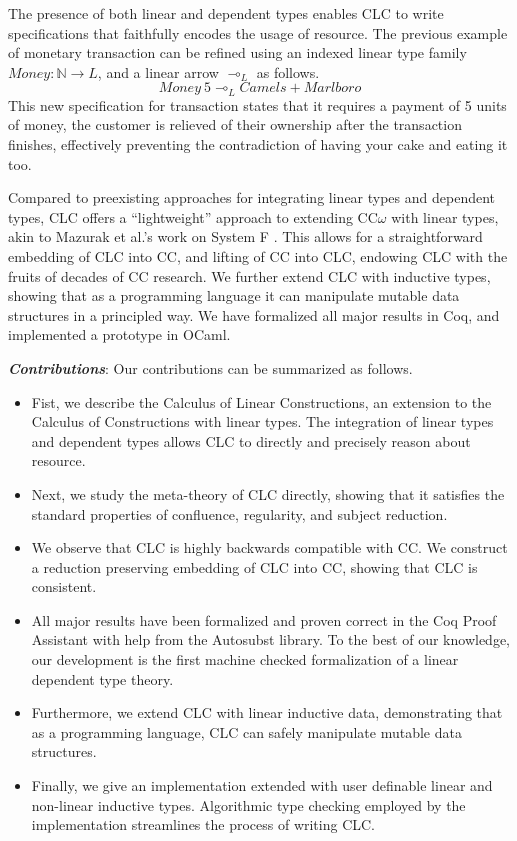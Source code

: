 \documentclass{article}
\theoremstyle{definition}
\begin{document}
  The presence of both linear and dependent types enables CLC to write specifications that faithfully encodes the usage of resource. The previous example of monetary transaction can be refined using an indexed linear type family $Money : \mathbb{N} \rightarrow L$, and a linear arrow $\multimap_L$ as follows.
  \begin{equation*}
    Money\ 5 \multimap_L Camels + Marlboro
  \end{equation*}
  This new specification for transaction states that it requires a payment of 5 units of money, the customer is relieved of their ownership after the transaction finishes, effectively preventing the contradiction of having your cake and eating it too.

  Compared to preexisting approaches for integrating linear types and dependent types, CLC offers a ``lightweight'' approach to extending CC$\omega$ with linear types, akin to Mazurak et al.'s work on System F \cite{mazurak}. This allows for a straightforward embedding of CLC into CC, and lifting of CC into CLC, endowing CLC with the fruits of decades of CC research. We further extend CLC with inductive types, showing that as a programming language it can manipulate mutable data structures in a principled way. We have formalized all major results in Coq, and implemented a prototype in OCaml. 

  \medskip

  \noindent \textbf{\textit{Contributions}}: 
  Our contributions can be summarized as follows.
  \begin{itemize}
    \item Fist, we describe the Calculus of Linear Constructions, an extension to the Calculus of Constructions with linear types. The integration of linear types and dependent types allows CLC to directly and precisely reason about resource.
    \item Next, we study the meta-theory of CLC directly, showing that it satisfies the standard properties of confluence, regularity, and subject reduction. 
    \item We observe that CLC is highly backwards compatible with CC. We construct a reduction preserving embedding of CLC into CC, showing that CLC is consistent. 
    \item All major results have been formalized and proven correct in the Coq Proof Assistant with help from the Autosubst \cite{autosubst} library. To the best of our knowledge, our development is the first machine checked formalization of a linear dependent type theory.
    \item Furthermore, we extend CLC with linear inductive data, demonstrating that as a programming language, CLC can safely manipulate mutable data structures.
    \item Finally, we give an implementation extended with user definable linear and non-linear inductive types. Algorithmic type checking employed by the implementation streamlines the process of writing CLC.
  \end{itemize}
\end{document}
